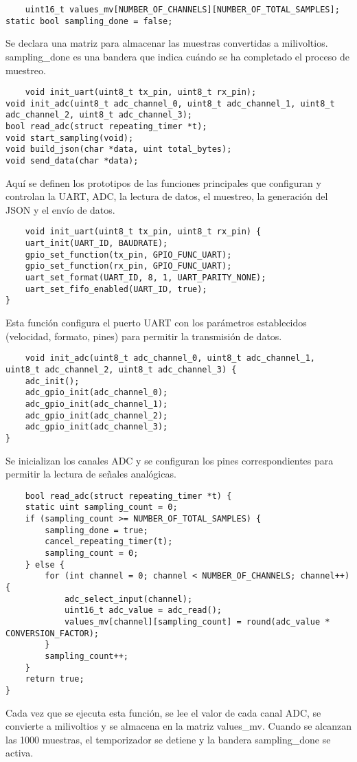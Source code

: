 \documentclass{article}
\begin{document}
\begin{lstlisting}
    uint16_t values_mv[NUMBER_OF_CHANNELS][NUMBER_OF_TOTAL_SAMPLES];
static bool sampling_done = false;
\end{lstlisting}
Se declara una matriz para almacenar las muestras convertidas a milivoltios. sampling\_done es una bandera que indica cuándo se ha completado el proceso de muestreo.

\begin{lstlisting}
    void init_uart(uint8_t tx_pin, uint8_t rx_pin);
void init_adc(uint8_t adc_channel_0, uint8_t adc_channel_1, uint8_t adc_channel_2, uint8_t adc_channel_3);
bool read_adc(struct repeating_timer *t);
void start_sampling(void);
void build_json(char *data, uint total_bytes);
void send_data(char *data);
\end{lstlisting}
Aquí se definen los prototipos de las funciones principales que configuran y controlan la UART, ADC, la lectura de datos, el muestreo, la generación del JSON y el envío de datos.

\begin{lstlisting}
    void init_uart(uint8_t tx_pin, uint8_t rx_pin) {
    uart_init(UART_ID, BAUDRATE);
    gpio_set_function(tx_pin, GPIO_FUNC_UART);
    gpio_set_function(rx_pin, GPIO_FUNC_UART);
    uart_set_format(UART_ID, 8, 1, UART_PARITY_NONE);
    uart_set_fifo_enabled(UART_ID, true);
}
\end{lstlisting}
Esta función configura el puerto UART con los parámetros establecidos (velocidad, formato, pines) para permitir la transmisión de datos.

\begin{lstlisting}
    void init_adc(uint8_t adc_channel_0, uint8_t adc_channel_1, uint8_t adc_channel_2, uint8_t adc_channel_3) {
    adc_init();
    adc_gpio_init(adc_channel_0);
    adc_gpio_init(adc_channel_1);
    adc_gpio_init(adc_channel_2);
    adc_gpio_init(adc_channel_3);
}
\end{lstlisting}
Se inicializan los canales ADC y se configuran los pines correspondientes para permitir la lectura de señales analógicas.

\begin{lstlisting}
    bool read_adc(struct repeating_timer *t) {
    static uint sampling_count = 0;
    if (sampling_count >= NUMBER_OF_TOTAL_SAMPLES) {
        sampling_done = true;
        cancel_repeating_timer(t);
        sampling_count = 0;
    } else {
        for (int channel = 0; channel < NUMBER_OF_CHANNELS; channel++) {
            adc_select_input(channel);
            uint16_t adc_value = adc_read();
            values_mv[channel][sampling_count] = round(adc_value * CONVERSION_FACTOR);
        }
        sampling_count++;
    }
    return true;
}
\end{lstlisting}
Cada vez que se ejecuta esta función, se lee el valor de cada canal ADC, se convierte a milivoltios y se almacena en la matriz values\_mv. Cuando se alcanzan las 1000 muestras, el temporizador se detiene y la bandera sampling\_done se activa.
\end{document}
